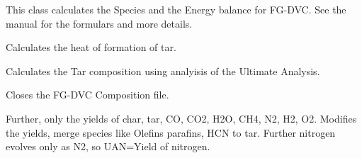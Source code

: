 \documentclass[letterpaper,10pt,english]{sphinxmanual}
\begin{document}
\begin{fulllineitems}
\label{FGDVCClasses:Compos_and_Energy.FGDVC_SpeciesBalance}
This class calculates the Species and the Energy balance for FG-DVC. See the manual for the formulars and more details.

\begin{fulllineitems}
\label{FGDVCClasses:Compos_and_Energy.FGDVC_SpeciesBalance._FGDVC_SpeciesBalance__EnergyBalance}
Calculates the heat of formation of tar.

\end{fulllineitems}


\begin{fulllineitems}
\label{FGDVCClasses:Compos_and_Energy.FGDVC_SpeciesBalance._FGDVC_SpeciesBalance__TarComp}
Calculates the Tar composition using analyisis of the Ultimate Analysis.

\end{fulllineitems}


\begin{fulllineitems}
\label{FGDVCClasses:Compos_and_Energy.FGDVC_SpeciesBalance._FGDVC_SpeciesBalance__closeFile}
Closes the FG-DVC Composition file.

\end{fulllineitems}


\begin{fulllineitems}
\label{FGDVCClasses:Compos_and_Energy.FGDVC_SpeciesBalance._FGDVC_SpeciesBalance__correctYields}
Further, only the yields of char, tar, CO, CO2, H2O, CH4, N2, H2, O2. Modifies the yields, merge species like Olefins parafins, HCN to tar. Further nitrogen evolves only as N2, so UAN=Yield of nitrogen.


\end{fulllineitems}
\end{fulllineitems}
\end{document}
